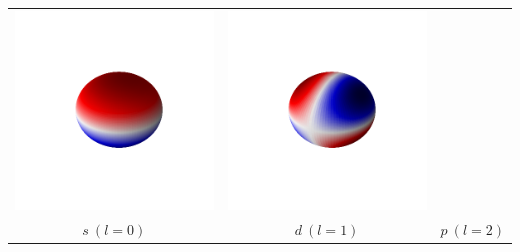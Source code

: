 \documentclass[11pt]{article}
\begin{document}
\begin{table}[H]
\begin{center}
\begin{tabular}[H]{|ccc|}
\includegraphics[scale=0.4]{./Images/p.png} &
\includegraphics[scale=0.4]{./Images/d.png} \\
$s\ (l=0) $ & $d\ (l=1)$ & $p\ (l=2)$ \\
\hline
\end{tabular}
 \end{center}
\end{table}
\end{document}

